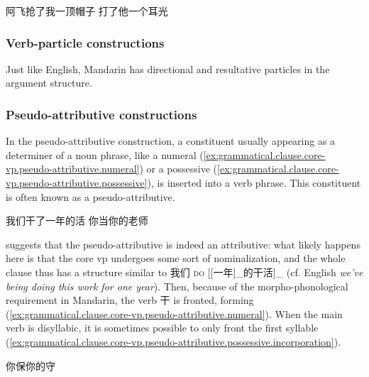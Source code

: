 \documentclass[UTF8, a4paper, oneside, scheme=plain, 12pt]{ctexrep}
\newcommand{\form}[1]{\emph{#1}}
\newcommand*{\category}[1]{\textsc{#1}}
\begin{document}
\begin{exe}
    \ex\label{ex:grammatical.clause.core-vp.valency.do-affect-patient.1} 阿飞抢了我一顶帽子
    \ex\label{ex:grammatical.clause.core-vp.valency.do-affect-patient.2} 打了他一个耳光
\end{exe}

\subsubsection{Verb-particle constructions}\label{sec:grammatical.clause.core-vp.particles}

Just like English, Mandarin has directional and resultative particles in the argument structure.


\subsubsection{Pseudo-attributive constructions}\label{sec:grammatical.clause.core-vp.pseudo-attributive}

In the pseudo-attributive construction,
a constituent usually appearing as a determiner of a noun phrase, 
like a numeral (\ref{ex:grammatical.clause.core-vp.pseudo-attributive.numeral})
or a possessive (\ref{ex:grammatical.clause.core-vp.pseudo-attributive.possessive}),
is inserted into a verb phrase.
This constituent is often known as a pseudo-attributive.

\begin{exe}
    \ex\label{ex:grammatical.clause.core-vp.pseudo-attributive.numeral} 我们干了一年的活
    \ex\label{ex:grammatical.clause.core-vp.pseudo-attributive.possessive} 你当你的老师
\end{exe}

\citet{huang2008} suggests that the pseudo-attributive is indeed an attributive:
what likely happens here is that the core \ac{vp} undergoes some sort of nominalization,
and the whole clause thus has a structure similar to 
我们 \category{do} [[一年]_{}的干活]_{} 
(cf. English \form{we've being doing this work for one year}).
Then, because of the morpho-phonological requirement in Mandarin,
the verb 干 is fronted, forming (\ref{ex:grammatical.clause.core-vp.pseudo-attributive.numeral}).
When the main verb is disyllabic, it is sometimes possible to only front the first syllable
(\ref{ex:grammatical.clause.core-vp.pseudo-attributive.possessive.incorporation}).

\begin{exe}
    \ex\label{ex:grammatical.clause.core-vp.pseudo-attributive.possessive.incorporation} 你保你的守
\end{exe}
\end{document}
